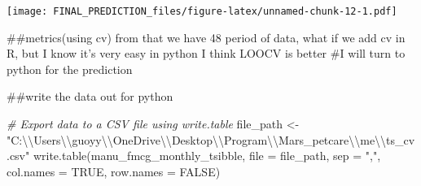 \documentclass[
]{article}
\newenvironment{Shaded}{\begin{snugshade}}{\end{snugshade}}
\newcommand{\AttributeTok}[1]{\textcolor[rgb]{0.77,0.63,0.00}{#1}}
\newcommand{\CommentTok}[1]{\textcolor[rgb]{0.56,0.35,0.01}{\textit{#1}}}
\newcommand{\ConstantTok}[1]{\textcolor[rgb]{0.00,0.00,0.00}{#1}}
\newcommand{\DecValTok}[1]{\textcolor[rgb]{0.00,0.00,0.81}{#1}}
\newcommand{\FunctionTok}[1]{\textcolor[rgb]{0.00,0.00,0.00}{#1}}
\newcommand{\NormalTok}[1]{#1}
\newcommand{\OtherTok}[1]{\textcolor[rgb]{0.56,0.35,0.01}{#1}}
\newcommand{\SpecialCharTok}[1]{\textcolor[rgb]{0.00,0.00,0.00}{#1}}
\newcommand{\StringTok}[1]{\textcolor[rgb]{0.31,0.60,0.02}{#1}}
\begin{document}
\begin{Shaded}
\end{Shaded}

\texttt{[image: FINAL\_PREDICTION\_files/figure-latex/unnamed-chunk-12-1.pdf]}

\#\#metrics(using cv) from that we have 48 period of data, what if we
add cv in R, but I know it's very easy in python I think LOOCV is better
\#I will turn to python for the prediction

\#\#write the data out for python

\begin{Shaded}
\begin{Highlighting}[]
\CommentTok{\# Export data to a CSV file using write.table}
\NormalTok{file\_path }\OtherTok{\textless{}{-}} \StringTok{"C:}\SpecialCharTok{\textbackslash{}\textbackslash{}}\StringTok{Users}\SpecialCharTok{\textbackslash{}\textbackslash{}}\StringTok{guoyy}\SpecialCharTok{\textbackslash{}\textbackslash{}}\StringTok{OneDrive}\SpecialCharTok{\textbackslash{}\textbackslash{}}\StringTok{Desktop}\SpecialCharTok{\textbackslash{}\textbackslash{}}\StringTok{Program}\SpecialCharTok{\textbackslash{}\textbackslash{}}\StringTok{Mars\_petcare}\SpecialCharTok{\textbackslash{}\textbackslash{}}\StringTok{me}\SpecialCharTok{\textbackslash{}\textbackslash{}}\StringTok{ts\_cv.csv"}
\FunctionTok{write.table}\NormalTok{(manu\_fmcg\_monthly\_tsibble, }
            \AttributeTok{file =}\NormalTok{ file\_path, }
            \AttributeTok{sep =} \StringTok{","}\NormalTok{, }\AttributeTok{col.names =} \ConstantTok{TRUE}\NormalTok{, }\AttributeTok{row.names =} \ConstantTok{FALSE}\NormalTok{)}
\end{Highlighting}
\end{Shaded}
\end{document}
